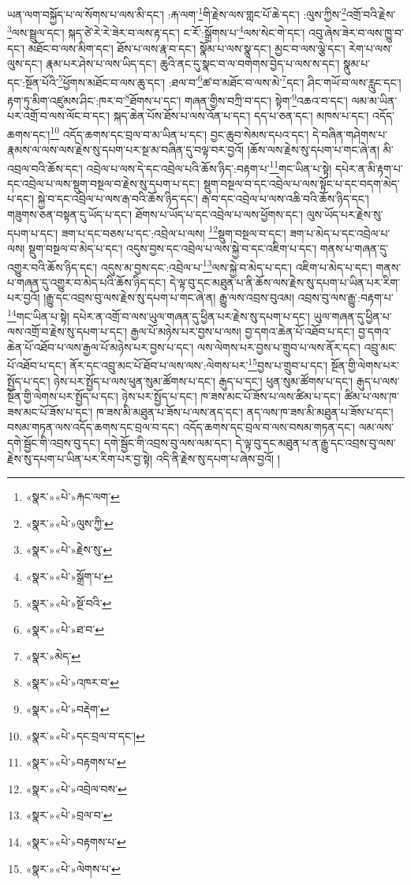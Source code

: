 ཡན་ལག་བསྐྱོད་པ་ལ་སོགས་པ་ལས་མི་དང་། :རྐ་ལག་\footnote{«སྣར་»«པེ་»རྐང་ལག་}གི་རྗེས་ལས་གླང་པོ་ཆེ་དང་། :ལུས་ཀྱིས་\footnote{«སྣར་»«པེ་»ལུས་ཀྱི་}འགྲོ་བའི་རྗེས་\footnote{«སྣར་»«པེ་»རྗེས་སུ་}ལས་སྦྲུལ་དང་། སྐད་ཙེ་རེ་རེ་ཟེར་བ་ལས་རྟ་དང་། ང་རོ་:སྒྲོགས་པ་\footnote{«སྣར་»«པེ་»སྒྲོག་པ་}ལས་སེང་གེ་དང་། འབུ་ཞེས་ཟེར་བ་ལས་ཁྱུ་བ་དང་། མཐོང་བ་ལས་མིག་དང་། ཐོས་པ་ལས་རྣ་བ་དང་། སྣོམ་པ་ལས་སྣ་དང་། མྱང་བ་ལས་ལྕེ་དང་། རེག་པ་ལས་ལུས་དང་། རྣམ་པར་ཤེས་པ་ལས་ཡིད་དང་། ཆུའི་ནང་དུ་སྣང་བ་ལ་བགེགས་བྱེད་པ་ལས་ས་དང་། སྣུམ་པ་དང་:སྔོན་པོའི་\footnote{«སྣར་»«པེ་»སྔོ་བའི་}ཕྱོགས་མཐོང་བ་ལས་ཆུ་དང་། :ཐལ་བ་\footnote{«སྣར་»«པེ་»ཐ་བ་}ཚ་བ་མཐོང་བ་ལས་མེ་\footnote{«སྣར་»མེད་}དང་། ཤིང་གཡོ་བ་ལས་རླུང་དང་། རྟག་ཏུ་མིག་འཛུམས་ཤིང་:ཁར་བ་\footnote{«སྣར་»«པེ་»འཁར་བ་}ཐོགས་པ་དང་། གཞན་གྱིས་བཀྲི་བ་དང་། སྟེག་\footnote{«སྣར་»«པེ་»བརྡེག་}འཆའ་བ་དང་། ལམ་མ་ཡིན་པར་འགྲོ་བ་ལས་ལོང་བ་དང་། སྐད་ཆེན་པོས་ཐོས་པ་ལས་འོན་པ་དང་། དད་པ་ཅན་དང་། མཁས་པ་དང་། འདོད་ཆགས་དང་།\footnote{«སྣར་»«པེ་»དང་བྲལ་བ་དང་།} འདོད་ཆགས་དང་བྲལ་བ་མ་ཡིན་པ་དང་། བྱང་ཆུབ་སེམས་དཔའ་དང་། དེ་བཞིན་གཤེགས་པ་རྣམས་ལ་ལས་ལས་རྗེས་སུ་དཔག་པར་སྔ་མ་བཞིན་དུ་བལྟ་བར་བྱའོ། །ཆོས་ལས་རྗེས་སུ་དཔག་པ་གང་ཞེ་ན། མི་འབྲལ་བའི་ཆོས་དང་། འབྲེལ་པ་ལས་དེ་དང་འབྲེལ་པའི་ཆོས་ཉིད་:བརྟག་པ་\footnote{«སྣར་»«པེ་»བརྟགས་པ་}གང་ཡིན་པ་སྟེ། དཔེར་ན་མི་རྟག་པ་དང་འབྲེལ་པ་ལས་སྡུག་བསྔལ་བ་རྗེས་སུ་དཔག་པ་དང་། སྡུག་བསྔལ་བ་དང་འབྲེལ་པ་ལས་སྟོང་པ་དང་བདག་མེད་པ་དང་། སྐྱེ་བ་དང་འབྲེལ་པ་ལས་རྒ་བའི་ཆོས་ཉིད་དང་། རྒ་བ་དང་འབྲེལ་པ་ལས་འཆི་བའི་ཆོས་ཉིད་དང་། གཟུགས་ཅན་བསྟན་དུ་ཡོད་པ་དང་། ཐོགས་པ་ཡོད་པ་དང་འབྲེལ་པ་ལས་ཕྱོགས་དང་། ལུས་ཡོད་པར་རྗེས་སུ་དཔག་པ་དང་། ཟག་པ་དང་བཅས་པ་དང་:འབྲེལ་པ་ལས། \footnote{«སྣར་»«པེ་»འབྲེལ་བས་}སྡུག་བསྔལ་བ་དང་། ཟག་པ་མེད་པ་དང་འབྲེལ་པ་ལས། སྡུག་བསྔལ་བ་མེད་པ་དང་། འདུས་བྱས་དང་འབྲེལ་པ་ལས་སྐྱེ་བ་དང་འཇིག་པ་དང་། གནས་པ་གཞན་དུ་འགྱུར་བའི་ཆོས་ཉིད་དང་། འདུས་མ་བྱས་དང་:འབྲེལ་པ་\footnote{«སྣར་»«པེ་»བྲལ་བ་}ལས་སྐྱེ་བ་མེད་པ་དང་། འཇིག་པ་མེད་པ་དང་། གནས་པ་གཞན་དུ་འགྱུར་བ་མེད་པའི་ཆོས་ཉིད་དང་། དེ་ལྟ་བུ་དང་མཐུན་པ་ནི་ཆོས་ལས་རྗེས་སུ་དཔག་པ་ཡིན་པར་རིག་པར་བྱའོ། །རྒྱུ་དང་འབྲས་བུ་ལས་རྗེས་སུ་དཔག་པ་གང་ཞེ་ན། རྒྱུ་ལས་འབྲས་བུའམ། འབྲས་བུ་ལས་རྒྱུ་:བརྟག་པ་\footnote{«སྣར་»«པེ་»བརྟགས་པ་}གང་ཡིན་པ་སྟེ། དཔེར་ན་འགྲོ་བ་ལས་ཡུལ་གཞན་དུ་ཕྱིན་པར་རྗེས་སུ་དཔག་པ་དང་། ཡུལ་གཞན་དུ་ཕྱིན་པ་ལས་འགྲོ་བ་རྗེས་སུ་དཔག་པ་དང་། རྒྱལ་པོ་མཉེས་པར་བྱས་པ་ལས། བྱ་དགའ་ཆེན་པོ་འཐོབ་པ་དང་། བྱ་དགའ་ཆེན་པོ་འཐོབ་པ་ལས་རྒྱལ་པོ་མཉེས་པར་བྱས་པ་དང་། ལས་ལེགས་པར་བྱས་པ་གྲུབ་པ་ལས་ནོར་དང་། འབྲུ་མང་པོ་འཐོབ་པ་དང་། ནོར་དང་འབྲུ་མང་པོ་ཐོབ་པ་ལས་ལས་:ལེགས་པར་\footnote{«སྣར་»«པེ་»ལེགས་པ་}བྱས་པ་གྲུབ་པ་དང་། སྔོན་གྱི་ལེགས་པར་སྤྱོད་པ་དང་། ཉེས་པར་སྤྱོད་པ་ལས་ཕུན་སུམ་ཚོགས་པ་དང་། རྒུད་པ་དང་། ཕུན་སུམ་ཚོགས་པ་དང་། རྒུད་པ་ལས་སྔོན་གྱི་ལེགས་པར་སྤྱོད་པ་དང་། ཉེས་པར་སྤྱོད་པ་དང་། ཁ་ཟས་མང་པོ་ཟོས་པ་ལས་ཚིམ་པ་དང་། ཚིམ་པ་ལས་ཁ་ཟས་མང་པོ་ཟོས་པ་དང་། ཁ་ཟས་མི་མཐུན་པ་ཟོས་པ་ལས་ནད་དང་། ནད་ལས་ཁ་ཟས་མི་མཐུན་པ་ཟོས་པ་དང་། བསམ་གཏན་ལས་འདོད་ཆགས་དང་བྲལ་བ་དང་། འདོད་ཆགས་དང་བྲལ་བ་ལས་བསམ་གཏན་དང་། ལམ་ལས་དགེ་སྦྱོང་གི་འབྲས་བུ་དང་། དགེ་སྦྱོང་གི་འབྲས་བུ་ལས་ལམ་དང་། དེ་ལྟ་བུ་དང་མཐུན་པ་ན་རྒྱུ་དང་འབྲས་བུ་ལས་རྗེས་སུ་དཔག་པ་ཡིན་པར་རིག་པར་བྱ་སྟེ། འདི་ནི་རྗེས་སུ་དཔག་པ་ཞེས་བྱའོ། །
